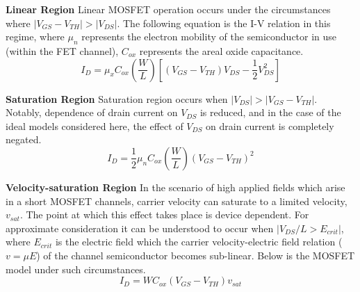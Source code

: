 
	\textbf{Linear Region}
	Linear MOSFET operation occurs under the circumstances where  $|V_{GS}-V_{TH}| > |V_{DS}|$. The following equation is the I-V relation in this regime, where $\mu_n$ represents the electron mobility of the semiconductor in use (within the FET channel), $C_{ox}$ represents the areal oxide capacitance. 
	\begin{equation}
		I_D = \mu_x C_{ox} \left(\frac{W}{L}\right)\left[(V_{GS}-V_{TH})V_{DS}-\frac{1}{2}V_{DS}^2\right]
	\end{equation}

	\textbf{Saturation Region}
	Saturation region occurs when $|V_{DS}| > |V_{GS}-V_{TH}|$. Notably, dependence of drain current on $V_{DS}$ is reduced, and in the case of the ideal models considered here, the effect of $V_{DS}$ on drain current is completely negated.
	\begin{equation}
		I_D = \frac{1}{2}\mu_n C_{ox} \left(\frac{W}{L}\right)(V_{GS}-V_{TH})^2
	\end{equation}


	\textbf{Velocity-saturation Region}
	In the scenario of high applied fields which arise in a short MOSFET channels, carrier velocity can saturate to a limited velocity, $v_{sat}$. The point at which this effect takes place is device dependent. For approximate consideration it can be understood to occur when $|V_{DS}/L > E_{crit}|$, where $E_{crit}$ is the electric field which the carrier velocity-electric field relation ($v = \mu E$) of the channel semiconductor becomes sub-linear. Below is the MOSFET model under such circumstances.
	\begin{equation}
		I_D = WC_{ox}(V_{GS}-V_{TH})v_{sat}
	\end{equation}

